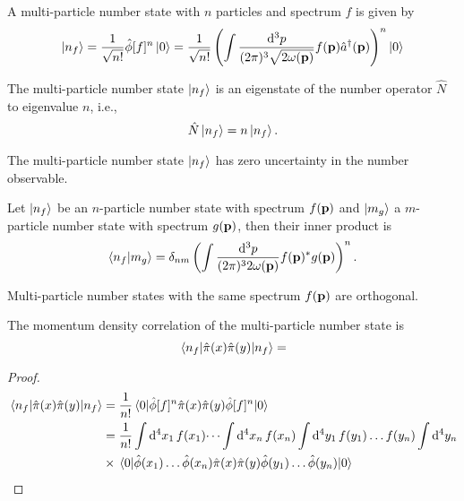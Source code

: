 \begin{definition}
	A multi-particle number state with $n$ particles and spectrum $f$ is given by
	\begin{equation}
		\ket{n_f}
		=
		\frac{1}{\sqrt{n!}}
		\hat\phi[f]^n
		\ket{0}
		=
		\frac{1}{\sqrt{n!}}
		\left(
			\int\frac{\dd[3]{p}}{(2\pi)^3\sqrt{2\omega(\vb{p})}}
			f(\vb{p})
			\hat{a}^\dagger(\vb{p})
		\right)^n
		\ket{0}
	\end{equation}
\end{definition}
\begin{theorem}
	The multi-particle number state $\ket{n_f}$ is an eigenstate of the number operator $\hat{N}$ to eigenvalue $n$, i.e.,
	\begin{equation}
		\hat{N}
		\ket{n_f}
		=
		n
		\ket{n_f}
		.
	\end{equation}
\end{theorem}
\begin{corollary}
	The multi-particle number state $\ket{n_f}$ has zero uncertainty in the number observable.
\end{corollary}
\begin{theorem}\label{thm:multi_particle_number_state_inner_product}
	Let $\ket{n_f}$ be an $n$-particle number state with spectrum $f(\vb{p})$ and $\ket{m_g}$ a $m$-particle number state with spectrum $g(\vb{p})$, then their inner product is
	\begin{equation}
		\braket{n_f}{m_g}
		=
		\delta_{nm}
		\left(
			\int\frac{\dd[3]{p}}{(2\pi)^32\omega(\vb{p})}
			f(\vb{p})^*
			g(\vb{p})
		\right)^n
		.
	\end{equation}
\end{theorem}
\begin{corollary}
	Multi-particle number states with the same spectrum $f(\vb{p})$ are orthogonal.
\end{corollary}
\begin{lemma}
	The momentum density correlation of the multi-particle number state is
	\begin{equation}
		\expval{\hat\pi(x)\hat\pi(y)}{n_f}
		=
	\end{equation}
\end{lemma}
\begin{proof}
	\begin{equation*}
		\begin{split}
			\expval{
				\hat\pi(x)
				\hat\pi(y)
			}{n_f}
			&=
			\frac{1}{n!}
			\expval{
				\hat\phi[f]^n
				\hat\pi(x)
				\hat\pi(y)
				\hat\phi[f]^n
			}{0}
			\\
			&=
			\frac{1}{n!}
			\int\dd[4]{x_1}
			f(x_1)
			\dots
			\int\dd[4]{x_n}
			f(x_n)
			\int\dd[4]{y_1}
			f(y_1)
			\dots
			f(y_n)
			\int\dd[4]{y_n}
			\\
			&\times
			\expval{
				\hat\phi(x_1)
				\dots
				\hat\phi(x_n)
				\hat\pi(x)
				\hat\pi(y)
				\hat\phi(y_1)
				\dots
				\hat\phi(y_n)
			}{0}			
		\end{split}
	\end{equation*}
\end{proof}

